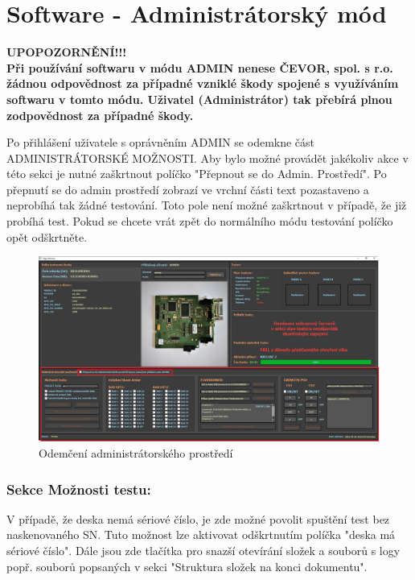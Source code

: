 \chapter{Software - Administrátorský mód}

\textbf{\color{red} UPOPOZORNĚNÍ!!!\\
 Při používání softwaru v módu ADMIN nenese ČEVOR, spol. s r.o. žádnou odpovědnost za případné vzniklé škody spojené
s využíváním softwaru v tomto módu. Uživatel (Administrátor) tak přebírá plnou zodpovědnost za případné škody.}

Po přihlášení uživatele s oprávněním ADMIN se odemkne část ADMINISTRÁTORSKÉ MOŽNOSTI.
Aby bylo možné provádět jakékoliv akce v této sekci je nutné zaškrtnout políčko "Přepnout se do Admin. Prostředí".
Po přepnutí se do admin prostředí zobrazí ve vrchní části text pozastaveno a neprobíhá tak žádné testování.
Toto pole není možné zaškrtnout v případě, že již probíhá test.
Pokud se chcete vrát zpět do normálního módu testování políčko opět odškrtněte.
\begin{figure}[ht!]
	\centering
	\includegraphics[width = 1\textwidth]{obrazky/ADMIN_edited.png}
    \caption{Odemčení administrátorského prostředí}
\end{figure}




\subsection{Sekce Možnosti testu:}
V případě, že deska nemá sériové číslo,
je zde možné povolit spuštění test bez naskenovaného SN.
Tuto možnost lze aktivovat odškrtnutím políčka "deska má sériové číslo".
Dále jsou zde tlačítka pro snazší otevírání složek a souborů s logy popř.
souborů popsaných v sekci "Struktura složek na konci dokumentu". 


